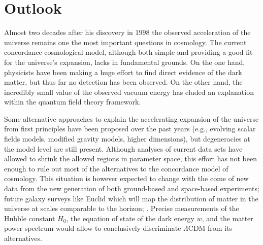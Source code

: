 \chapter{Outlook}
\label{chapter-outlook}

Almost two decades after his discovery in $1998$ the observed acceleration of the universe remains one the most important questions in cosmology. The current concordance cosmological model, although both simple and providing a good fit for the universe's expansion, lacks in fundamental grounds. On the one hand, physicists have been making a huge effort to find direct evidence of the dark matter, but thus far no detection has been observed. On the other hand, the incredibly small value of the observed vacuum energy has eluded an explanation within the quantum field theory framework. 

Some alternative approaches to explain the accelerating expansion of the universe from first principles have been proposed over the past years (e.g., evolving scalar fields models, modified gravity models, higher dimensions), but degeneracies at the model level are still present. Although analyses of current data sets have allowed to shrink the allowed regions in parameter space, this effort has not been enough to rule out most of the alternatives to the concordance model of cosmology. This situation is however expected to change with the come of new data from the new generation of both ground-based and space-based experiments; future galaxy surveys like Euclid which will map the distribution of matter in the universe at scales comparable to the horizon;  . Precise measurements of the Hubble constant $H_0$, the equation of state of the dark energy $w$, and the matter power spectrum would allow to conclusively discriminate $\Lambda$CDM from its alternatives. 

